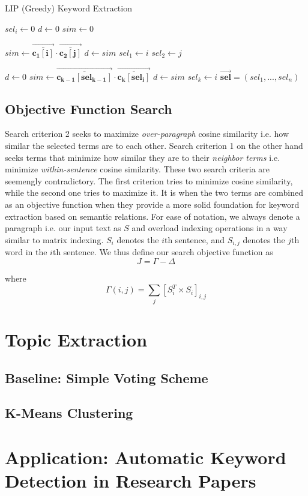 \documentclass[12pt]{article}
\begin{document}
\begin{algorithm}[H]
\caption{LIP (Greedy) Keyword Extraction}\label{euclid}
\begin{algorithmic}[1]
\State $sel_i \gets 0$
 \EndFor
\State $d \gets 0$
\State $sim \gets 0$

            \State$sim \gets\bm{\vec{\bar{c_1[i]}}} \cdot \bm{\vec{\bar{c_2[j]}}}$
              \State $d \gets sim$
              \State$ sel_1 \gets i$
              \State $ sel_2 \gets j$
         \EndIf
        \EndFor
\EndFor

    \State $d \gets 0$
        \State$sim \gets \bm{\vec{\bar{c_{k-1}[sel_{k-1}]}}} \cdot \bm{\vec{\bar{c_{k}[sel_{i}]}}}$
              \State$d \gets sim$
              \State$sel_k \gets i$
        \EndIf
    \EndFor
\EndFor
\Return $\bm{\vec{sel}} = (sel_1, ..., sel_n)$

\EndProcedure
\end{algorithmic}
\end{algorithm}


\subsection{Objective Function Search}
Search criterion 2 seeks to maximize \textit{over-paragraph} cosine similarity i.e. how similar the selected terms are to each other. Search criterion 1 on the other hand seeks terms that minimize how similar they are to their \textit{neighbor terms} i.e. minimize \textit{within-sentence} cosine similarity. These two search criteria are seemengly contradictory. The first criterion tries to minimize cosine similarity, while the second one tries to maximize it. It is when the two terms are combined as an objective function when they provide a more solid foundation for keyword extraction based on semantic relations. For ease of notation, we always denote a paragraph i.e. our input text as $S$ and overload indexing operations in a way similar to matrix indexing. $S_{i}$ denotes the $i$th sentence, and $S_{i,j}$ denotes the $j$th word in the $i$th sentence. We thus define our search objective function as
\[J = \Gamma - \Delta\]

where
\[\Gamma(i,j) = \sum\limits_{j} [S_{i}^ T \times S_{i}]_{i,j}\]



\section{Topic Extraction}
\subsection{Baseline: Simple Voting Scheme}
\subsection{K-Means Clustering}
\section{Application: Automatic Keyword Detection in Research Papers}
\end{document}
